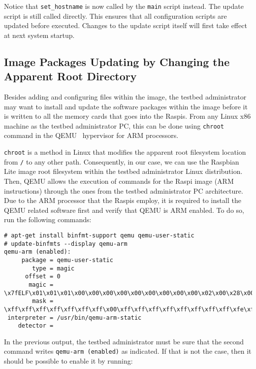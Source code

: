 Notice that \texttt{set\_hostname} is now called by the \texttt{main}
script instead. The update script is still called directly. This ensures that
all configuration scripts are updated before executed. Changes to the update
script itself will first take effect at next system startup.

\subsection{Image Packages Updating by Changing the Apparent Root Directory}
Besides adding and configuring files within the image, the testbed
administrator may want to install and update the software packages
within the image before it is written to all the memory cards that goes
into the \ac{Raspi}s. From any Linux x86 machine as the testbed administrator
\ac{PC}, this can be done using \texttt{chroot} command in the
QEMU~\cite{QemuUserEmulation} hypervisor for \ac{ARM} processors.

\texttt{chroot} is a method in Linux that modifies the apparent root
filesystem location from \texttt{/} to any other path. Consequently, in
our case, we can use the Raspbian Lite image root filesystem within the
testbed administrator Linux distribution. Then, QEMU allows the execution
of commands for the \ac{Raspi} image (\ac{ARM} instructions) through the ones
from the testbed administrator \ac{PC} architecture. Due to the \ac{ARM}
processor that the \ac{Raspi}s employ, it is required to install the QEMU related software first and verify that QEMU is \ac{ARM} enabled. To do so,
run the following commands:

\begin{lstlisting}[]
# apt-get install binfmt-support qemu qemu-user-static
# update-binfmts --display qemu-arm
qemu-arm (enabled):
     package = qemu-user-static
        type = magic
      offset = 0
       magic = \x7fELF\x01\x01\x01\x00\x00\x00\x00\x00\x00\x00\x00\x00\x02\x00\x28\x00
        mask = \xff\xff\xff\xff\xff\xff\xff\x00\xff\xff\xff\xff\xff\xff\xff\xff\xfe\xff\xff\xff
 interpreter = /usr/bin/qemu-arm-static
    detector =
\end{lstlisting}
\FloatBarrier
\vspace{-5mm}

In the previous output, the testbed administrator must be sure that the second
command writes \texttt{qemu-arm (enabled)} as indicated. If that is not the
case, then it should be possible to enable it by running:


